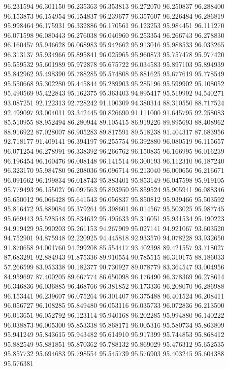 96.231594
96.301150
96.235363
96.353813
96.272070
96.250837
96.288400
96.153873
96.154954
96.154837
96.239677
96.357607
96.226484
96.286819
95.998464
96.175931
96.332886
96.170561
96.123253
95.984451
96.111270
96.071598
96.080443
96.276038
96.040960
96.253354
96.266743
96.278830
96.160457
95.946628
96.068983
95.942662
95.913016
95.988533
96.033265
96.313137
95.934966
95.895841
96.025965
95.960873
95.757478
95.977420
95.559532
95.601989
95.972878
95.675722
96.034583
95.897103
95.894939
95.842962
95.498390
95.788285
95.574808
95.881625
95.677619
95.778549
95.550668
95.302280
95.445844
95.289903
95.285196
95.599902
95.108052
95.490569
95.422843
95.162375
95.363403
94.895417
95.519992
94.540271
93.087251
92.122313
92.728242
91.100309
94.380314
88.310550
88.717524
92.499097
93.004011
93.342445
90.826690
91.111000
91.645795
92.258083
85.510955
88.952494
86.280944
89.105415
86.919226
89.895693
88.408962
88.916922
87.028007
86.905283
89.817591
89.518238
91.404317
87.683956
92.718177
91.409141
96.394197
96.255754
96.392880
96.080519
96.115657
96.071254
96.278991
96.338392
96.266762
96.150835
96.166995
96.016239
96.196454
96.160476
96.008148
96.141514
96.300193
96.112310
96.187240
96.323170
95.984780
96.208036
96.096714
96.213040
96.000656
96.216671
96.091662
96.199834
96.018743
95.883401
95.853149
96.047598
95.919105
95.779493
96.155027
96.097563
95.893950
95.859524
95.905941
96.088346
95.650012
96.066428
95.641543
96.056837
95.850812
95.939466
95.503592
95.816472
95.889084
95.379261
95.398601
96.014567
95.503025
95.987745
95.669443
95.528548
95.834632
95.495633
95.316051
95.931534
95.190223
94.919429
95.990203
95.261153
94.267909
95.027141
94.921067
93.603520
94.752901
94.875948
92.220925
94.445818
92.933570
94.078228
93.932650
91.870658
94.001760
94.299208
85.554417
93.402398
89.421557
93.718027
87.683291
92.884943
91.875336
89.910554
90.785515
86.310175
88.186033
57.266599
83.953338
90.182377
90.730927
89.078779
83.364547
93.004956
84.959697
87.400205
89.667774
86.650098
96.176490
96.378369
96.278614
96.346836
96.036885
96.468766
96.381852
96.173336
96.208070
96.286988
96.153441
96.239607
96.075264
96.301407
96.375488
96.401524
96.208411
96.056727
96.108285
95.849480
96.053116
96.035733
96.072836
96.213500
96.013651
96.052792
96.123114
95.940168
96.202285
95.994880
96.140222
96.038873
96.005300
95.853338
95.868171
96.005316
95.580734
95.863809
95.941249
95.843615
95.943482
95.614910
95.917399
95.744853
95.868412
95.882549
95.881851
95.870362
95.788132
95.869029
95.476312
95.652535
95.857732
95.694683
95.798554
95.545739
95.576903
95.403245
95.604388
95.576381
